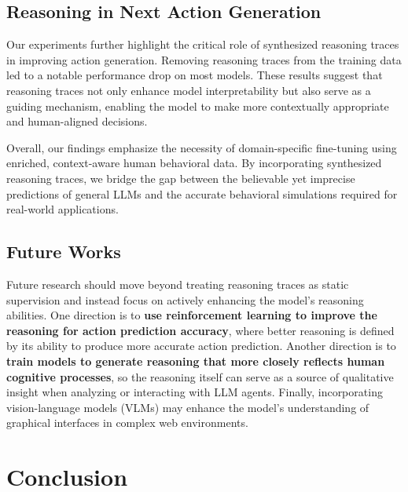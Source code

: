 \documentclass{article} %
\begin{document}
\subsection{Reasoning in Next Action Generation}

Our experiments further highlight the critical role of synthesized reasoning traces in improving action generation. 
Removing reasoning traces from the training data led to a notable performance drop on most models. 
These results suggest that reasoning traces not only enhance model interpretability but also serve as a guiding mechanism, enabling the model to make more contextually appropriate and human-aligned decisions. 

Overall, our findings emphasize the necessity of domain-specific fine-tuning using enriched, context-aware human behavioral data.
By incorporating synthesized reasoning traces, we bridge the gap between the believable yet imprecise predictions of general LLMs and the accurate behavioral simulations required for real-world applications. 

\subsection{Future Works}

Future research should move beyond treating reasoning traces as static supervision and instead focus on actively enhancing the model's reasoning abilities. 
One direction is to \textbf{use reinforcement learning to improve the reasoning for action prediction accuracy}, where better reasoning is defined by its ability to produce more accurate action prediction. 
Another direction is to \textbf{train models to generate reasoning that more closely reflects human cognitive processes}, so the reasoning itself can serve as a source of qualitative insight when analyzing or interacting with LLM agents.
Finally, incorporating vision-language models (VLMs) may enhance the model's understanding of graphical interfaces in complex web environments.

\section{Conclusion}
\end{document}
